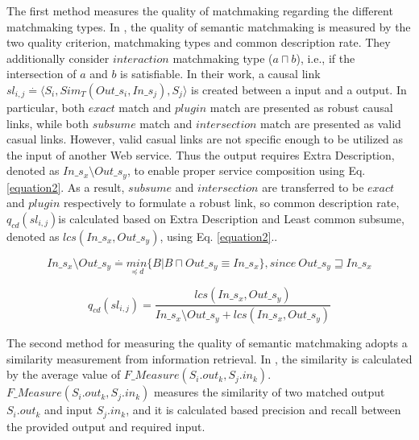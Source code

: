 The first method measures the quality of matchmaking regarding the different matchmaking types. In \cite{lecue2007making}, the quality of semantic matchmaking is measured by the two quality criterion, matchmaking types and common description rate. They additionally consider $interaction$ matchmaking type ($a \sqcap b$), i.e., if the intersection of $a$ and $b$ is satisfiable. In their work, a causal link \begin{math} sl_{i,j} \stackrel{.}{=} \langle S_i, Sim_{T}(Out\_s_i,In\_s_j),S_j  \rangle \end{math} is created between a input and a output. In particular, both $exact$ match and $plugin$ match are presented as robust causal links, while both $subsume$ match and $intersection$ match are presented as valid casual links. However, valid casual links are not specific enough to be utilized as the input of another Web service. Thus the output requires Extra Description, denoted as \begin{math} In\_s_x \setminus Out\_s_y \end{math}, to enable proper service composition using Eq. \ref{equation2}. As a result, $subsume$ and $intersection$ are transferred to be $exact$ and $plugin$ respectively to formulate a robust link, so common description rate, \begin{math} q_{cd}(sl_{i,j}) \end{math}is calculated based on Extra Description and Least common subsume, denoted as \begin{math} lcs (In\_s_x, Out\_s_y) \end{math}, using Eq. \ref{equation2}..

\begin{equation}
In\_s_x \setminus Out\_s_y \stackrel{.}{=} \underset {\preceq d}{min} \{ B|B\sqcap  Out\_s_y \equiv In\_s_x  \} , since \  Out\_s_y \sqsupseteq In\_s_x
 \label{equation2}
\end{equation}


\begin{equation}
q_{cd}(sl_{i,j}) = \frac{lcs (In\_s_x, Out\_s_y)} {In\_s_x \setminus Out\_s_y + lcs (In\_s_x, Out\_s_y)}
 \label{equation3}
\end{equation}

The second method for measuring the quality of semantic matchmaking adopts a similarity measurement from information retrieval. In \cite{pop2009immune}, the similarity is calculated by the average value of $F\_Measure(S_i.out_k, S_j.in_k)$. $F\_Measure(S_i.out_k, S_j.in_k)$ measures the similarity of two matched output $S_i.out_k$ and input $S_j.in_k$, and it is calculated based precision and recall between the provided output and required input.


